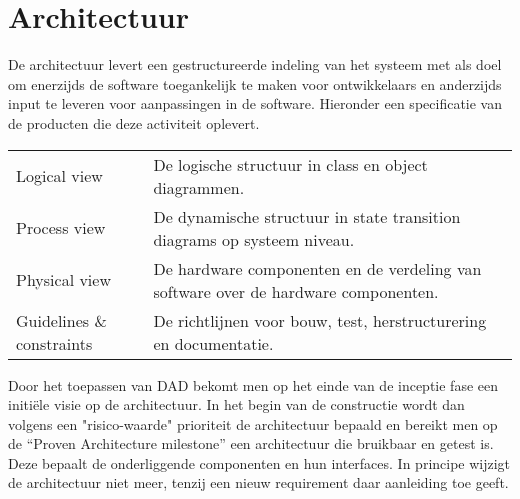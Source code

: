 
\section{Architectuur}

De architectuur levert een gestructureerde indeling van het systeem met als doel om enerzijds de software
toegankelijk te maken voor ontwikkelaars en anderzijds input te leveren voor aanpassingen in de software. Hieronder
een specificatie van de producten die deze activiteit oplevert.

{\small\sf
\begin{center}
\begin{tabular}{lp{25em}}
Logical view & De logische structuur in class en object diagrammen.\\
Process view & De dynamische structuur in state
transition diagrams op systeem niveau.\\
Physical view &  De hardware componenten en de verdeling van
software over de hardware componenten.\\
Guidelines \& constraints & De richtlijnen voor bouw,
test, herstructurering en documentatie.\\
\end{tabular}
\end{center}
}

Door het toepassen van DAD bekomt men op het einde van de inceptie fase een
initi\"ele visie op de architectuur. In het begin van de constructie wordt dan
volgens een "risico-waarde" prioriteit de architectuur bepaald en bereikt men
op de ``Proven Architecture milestone'' een architectuur die bruikbaar en getest
is. Deze bepaalt de onderliggende componenten en hun interfaces.
In principe wijzigt de architectuur niet meer, tenzij een nieuw requirement
daar aanleiding toe geeft.
